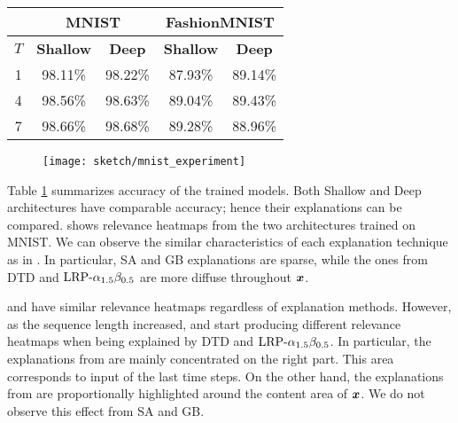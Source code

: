 \renewcommand{\arraystretch}{1.5}
\begin{table}[]
\centering
\begin{tabular}{cc|c|c|c|}
\cline{2-5}
& \multicolumn{2}{|c|}{\textbf{MNIST}} & \multicolumn{2}{|c|}{\textbf{FashionMNIST}} \\ \hline
\multicolumn{1}{|c|}{$T$}   & \multicolumn{1}{c|}{\textbf{Shallow}} & \multicolumn{1}{c|}{\textbf{Deep}} & \multicolumn{1}{c|}{\textbf{Shallow}} & \multicolumn{1}{c|}{\textbf{Deep}} \\ \hline
\multicolumn{1}{|c|}{1} & 98.11\%   & 98.22\% & 87.93\%  & 89.14\%                           \\
\multicolumn{1}{|c|}{4} & 98.56\% & 98.63\%  & 89.04\%  & 89.43\%                            \\
\multicolumn{1}{|c|}{7} & 98.66\%  & 98.68\% & 89.28\%  & 88.96\%  \\ \hline
\end{tabular}
\label{tab:mnist_model_acc}
\end{table}
\renewcommand{\arraystretch}{1}



 \begin{figure}[!htb]
\centering
\texttt{[image: sketch/mnist\_experiment]}
\label{fig:mnist_experiment}
\end{figure}


Table \ref{tab:mnist_model_acc} summarizes accuracy of the trained models. Both Shallow and Deep architectures have comparable accuracy; hence their explanations can be compared. \addfigure{\ref{fig:mnist_experiment}} shows relevance heatmaps from the two architectures trained on MNIST.  We can observe the similar characteristics of each explanation technique as in \addfigure{\ref{fig:lenet_heatmaps}}. In particular, SA and GB explanations are sparse, while the ones from DTD and $\text{LRP-}\alpha_{1.5}\beta_{0.5}$ are more diffuse throughout $\boldsymbol{x}$. 

  and  have similar relevance heatmaps regardless of explanation methods.  However, as the sequence length increased,  and   start producing  different relevance heatmaps when being explained by DTD and $\text{LRP-}\alpha_{1.5}\beta_{0.5}$.  In particular,  the explanations from   are mainly concentrated on the right part. This area corresponds to input of the last time steps. On the other hand,  the explanations from  are proportionally  highlighted around the content area of $\boldsymbol{x}$. We do not observe this effect from SA and GB.


